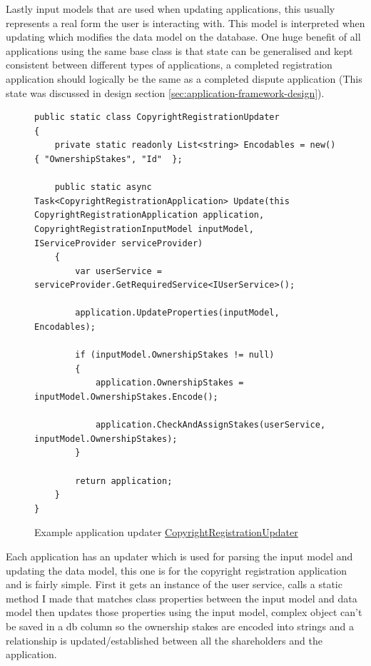 Lastly input models that are used when updating applications, this usually represents a real form the user is interacting with. This model is interpreted when updating which modifies the data model on the database.
\br
One huge benefit of all applications using the same base class is that state can be generalised and kept consistent between different types of applications, a completed registration application should logically be the same as a completed dispute application (This state was discussed in design section \ref{sec:application-framework-design}).

\begin{figure}[H]
\caption{Example application updater \href{https://github.com/MrHarrisonBarker/CRPL/blob/main/CRPL.Web/Core/Applications/Updaters/CopyrightRegistrationUpdater.cs}{CopyrightRegistrationUpdater}}
\centering
\begin{lstlisting}[language=CSharp]
public static class CopyrightRegistrationUpdater
{
    private static readonly List<string> Encodables = new() { "OwnershipStakes", "Id"  };
    
    public static async Task<CopyrightRegistrationApplication> Update(this CopyrightRegistrationApplication application, CopyrightRegistrationInputModel inputModel, IServiceProvider serviceProvider)
    {
        var userService = serviceProvider.GetRequiredService<IUserService>();
        
        application.UpdateProperties(inputModel, Encodables);

        if (inputModel.OwnershipStakes != null)
        {
            application.OwnershipStakes = inputModel.OwnershipStakes.Encode();

            application.CheckAndAssignStakes(userService, inputModel.OwnershipStakes);
        }

        return application;
    }
}
\end{lstlisting} 
\end{figure}

Each application has an updater which is used for parsing the input model and updating the data model, this one is for the copyright registration application and is fairly simple. First it gets an instance of the user service, calls a static method I made that matches class properties between the input model and data model then updates those properties using the input model, complex object can't be saved in a db column so the ownership stakes are encoded into strings and a relationship is updated/established between all the shareholders and the application.

